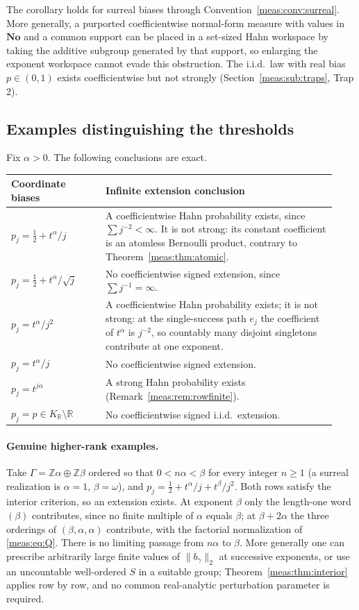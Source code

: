 \documentclass[11pt]{article}
\numberwithin{equation}{section}
\theoremstyle{definition}
\theoremstyle{remark}
\newcommand{\R}{\mathbb R}
\newcommand{\Z}{\mathbb Z}
\newcommand{\No}{\mathbf{No}}
\newcommand{\KR}{K_{\R}}
\newcommand{\norm}[1]{\lVert#1\rVert}
\begin{document}
The corollary holds for surreal biases through
Convention~\ref{meas:conv:surreal}. More generally, a purported coefficientwise
normal-form measure with values in $\No$ and a common support can be placed in a
set-sized Hahn workspace by taking the additive subgroup generated by that
support, so enlarging the exponent workspace cannot evade this obstruction.
The i.i.d.\ law with real bias $p\in(0,1)$ exists coefficientwise but not strongly
(Section~\ref{meas:sub:traps}, Trap 2).

\subsection{Examples distinguishing the thresholds}

Fix $\alpha>0$. The following conclusions are exact.
\begin{center}
\small
\begin{tabular}{@{}p{0.27\linewidth}p{0.66\linewidth}@{}}
\toprule
Coordinate biases & Infinite extension conclusion\\
\midrule
$p_j=\frac12+t^\alpha/j$ & A coefficientwise Hahn probability exists, since
$\sum j^{-2}<\infty$. It is not strong: its constant coefficient is an atomless
Bernoulli product, contrary to Theorem~\ref{meas:thm:atomic}.\\[3pt]
$p_j=\frac12+t^\alpha/\sqrt j$ & No coefficientwise signed extension, since
$\sum j^{-1}=\infty$.\\[3pt]
$p_j=t^\alpha/j^2$ & A coefficientwise Hahn probability exists; it is not strong:
at the single-success path $e_j$ the coefficient of $t^\alpha$ is $j^{-2}$, so
countably many disjoint singletons contribute at one exponent.\\[3pt]
$p_j=t^\alpha/j$ & No coefficientwise signed extension.\\[3pt]
$p_j=t^{j\alpha}$ & A strong Hahn probability exists
(Remark~\ref{meas:rem:rowfinite}).\\[3pt]
$p_j=p\in\KR\setminus\R$ & No coefficientwise signed i.i.d.\ extension.\\
\bottomrule
\end{tabular}
\end{center}

\paragraph{Genuine higher-rank examples.} Take $\Gamma=\Z\alpha\oplus\Z\beta$ ordered
so that $0<n\alpha<\beta$ for every integer $n\ge1$ (a surreal realization is
$\alpha=1$, $\beta=\omega$), and $p_j=\frac12+t^\alpha/j+t^\beta/j^2$. Both rows satisfy the
interior criterion, so an extension exists. At exponent $\beta$ only the length-one
word $(\beta)$ contributes, since no finite multiple of $\alpha$ equals $\beta$; at
$\beta+2\alpha$ the three orderings of $(\beta,\alpha,\alpha)$ contribute, with the factorial
normalization of \eqref{meas:eq:Q}. There is no limiting passage from $n\alpha$ to
$\beta$. More generally one can prescribe arbitrarily large finite values of
$\norm{b_\gamma}_2$ at successive exponents, or use an uncountable well-ordered $S$
in a suitable group; Theorem~\ref{meas:thm:interior} applies row by row, and no
common real-analytic perturbation parameter is required.
\end{document}
